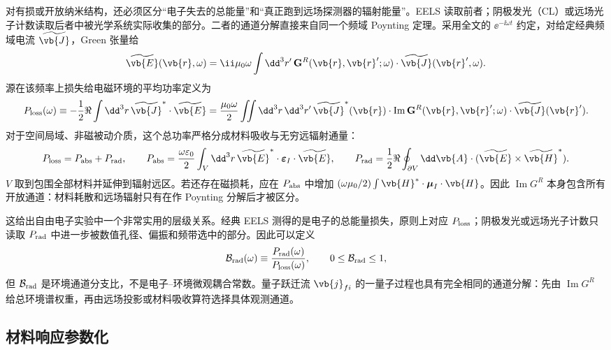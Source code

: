 对有损或开放纳米结构，还必须区分“电子失去的总能量”和“真正跑到远场探测器的辐射能量”。EELS 读取前者；阴极发光（CL）或远场光子计数读取后者中被光学系统实际收集的部分。二者的通道分解直接来自同一个频域 Poynting 定理。采用全文的 $\ee^{-\ii\omega t}$ 约定，对给定经典频域电流 $\widetilde{\vb{J}}$，Green 张量给
\[
\widetilde{\vb{E}}(\vb{r},\omega)
=\ii\mu_0\omega\int\dd^3r'\,
\mathbf G^R(\vb{r},\vb{r}';\omega)\cdot
\widetilde{\vb{J}}(\vb{r}',\omega).
\]
源在该频率上损失给电磁环境的平均功率定义为
\begin{equation}
{
P_{\rm loss}(\omega)
\equiv
-\frac12\Re\int\dd^3r\,
\widetilde{\vb{J}}^{*}\cdot\widetilde{\vb{E}}
=\frac{\mu_0\omega}{2}
\iint\dd^3r\,\dd^3r'\,
\widetilde{\vb{J}}^{*}(\vb{r})\cdot
\operatorname{Im}\mathbf G^R(\vb{r},\vb{r}';\omega)
\cdot\widetilde{\vb{J}}(\vb{r}').}
\label{eq:source_total_loss_green_power}
\end{equation}
对于空间局域、非磁被动介质，这个总功率严格分成材料吸收与无穷远辐射通量：
\begin{equation}
{
P_{\rm loss}=P_{\rm abs}+P_{\rm rad},
\qquad
P_{\rm abs}
=\frac{\omega\varepsilon_0}{2}
\int_V\dd^3r\,
\widetilde{\vb{E}}^{*}\cdot
\boldsymbol\varepsilon_I\cdot
\widetilde{\vb{E}},
\qquad
P_{\rm rad}
=\frac12\Re\oint_{\partial V}\dd\vb{A}\cdot
(\widetilde{\vb{E}}\times\widetilde{\vb{H}}^{*}).}
\label{eq:loss_absorption_radiation_decomposition}
\end{equation}
$V$ 取到包围全部材料并延伸到辐射远区。若还存在磁损耗，应在 $P_{\rm abs}$ 中增加
$(\omega\mu_0/2)\int \vb{H}^*\cdot\boldsymbol\mu_I\cdot\vb{H}$。因此 $\operatorname{Im}G^R$ 本身包含所有开放通道：材料耗散和远场辐射只有在作 Poynting 分解后才被区分。

这给出自由电子实验中一个非常实用的层级关系。经典 EELS 测得的是电子的总能量损失，原则上对应 $P_{\rm loss}$；阴极发光或远场光子计数只读取 $P_{\rm rad}$ 中进一步被数值孔径、偏振和频带选中的部分。因此可以定义
\begin{equation}
{
\mathcal B_{\rm rad}(\omega)
\equiv\frac{P_{\rm rad}(\omega)}{P_{\rm loss}(\omega)},
\qquad 0\le\mathcal B_{\rm rad}\le1,}
\label{eq:radiative_branching_efficiency_green}
\end{equation}
但 $\mathcal B_{\rm rad}$ 是环境通道分支比，不是电子--环境微观耦合常数。量子跃迁流 $\vb{j}_{fi}$ 的一量子过程也具有完全相同的通道分解：先由 $\operatorname{Im}G^R$ 给总环境谱权重，再由远场投影或材料吸收算符选择具体观测通道。

\subsection{材料响应参数化}


